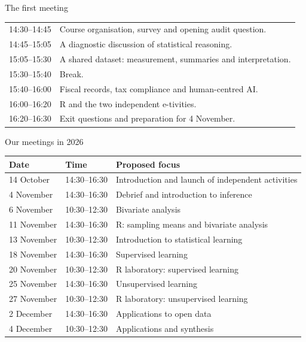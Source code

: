 \begin{frame}{The first meeting}
\begin{tabular}{l>{\raggedright\arraybackslash}p{}}\toprule
14:30--14:45 & Course organisation, survey and opening audit question.\\[2mm]
14:45--15:05 & A diagnostic discussion of statistical reasoning.\\[2mm]
15:05--15:30 & A shared dataset: measurement, summaries and interpretation.\\[2mm]
15:30--15:40 & Break.\\[2mm]
15:40--16:00 & Fiscal records, tax compliance and human-centred AI.\\[2mm]
16:00--16:20 & R and the two independent e-tivities.\\[2mm]
16:20--16:30 & Exit questions and preparation for 4 November.\\\bottomrule
\end{tabular}\par
\end{frame}

\begin{frame}{Our meetings in 2026}
\small
\begin{tabular}{ll>{\raggedright\arraybackslash}p{}}\toprule
\textbf{Date} & \textbf{Time} & \textbf{Proposed focus}\\\midrule
14 October & 14:30--16:30 & Introduction and launch of independent activities\\
4 November & 14:30--16:30 & Debrief and introduction to inference\\
6 November & 10:30--12:30 & Bivariate analysis\\
11 November & 14:30--16:30 & R: sampling means and bivariate analysis\\
13 November & 10:30--12:30 & Introduction to statistical learning\\
18 November & 14:30--16:30 & Supervised learning\\
20 November & 10:30--12:30 & R laboratory: supervised learning\\
25 November & 14:30--16:30 & Unsupervised learning\\
27 November & 10:30--12:30 & R laboratory: unsupervised learning\\
2 December & 14:30--16:30 & Applications to open data\\
4 December & 10:30--12:30 & Applications and synthesis\\\bottomrule
\end{tabular}\par
{}
\end{frame}


